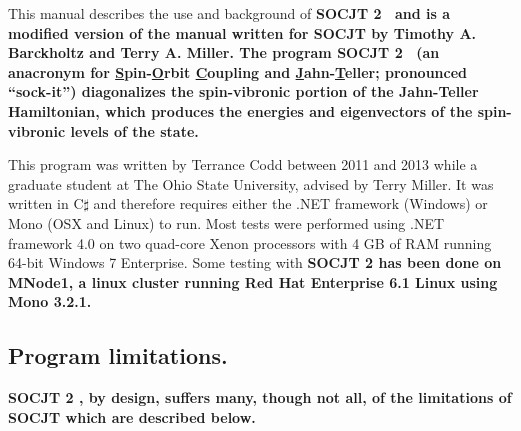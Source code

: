 \documentclass{article}
\newcommand{\ul}{\underline }
\newcommand{\socjttwo}{\bf{SOCJT 2 }}
\newcommand{\socjt}{{\bf SOCJT }}
\newcommand{\socrt}{{\bf SOCRT}}
\begin{document}
This manual describes the use and background of \socjttwo\ and is a modified version of the manual written for \socjt by Timothy A. Barckholtz and Terry A. Miller.
The program \socjttwo\ (an anacronym for {\ul S}pin-{\ul O}rbit {\ul C}oupling
and {\ul J}ahn-{\ul T}eller; pronounced ``sock-it'') diagonalizes the
spin-vibronic portion of the Jahn-Teller Hamiltonian, which produces
the energies and eigenvectors of the spin-vibronic levels of the
state.

\begin{comment}
Besides diagonalizing the spin-vibronic Hamiltonian, the programs
\socjt\ and \socrt\ calculate several properties of the system. All of
these properties are detailed later in section \ref{section:output}.
One of the most important items calculated by \socjt\ is the relative
intensities of the vibronic transitions involved in an electronic
transition to and from the degenerate state. These calculations assume
diagonal Franck-Condon factors, and only the intensities of
progressions of the Jahn-Teller active modes are computed. In the main
\socjt\ and \socrt\ programs, it is assumed that the non-Jahn-Teller
active state involved in the electronic transition is a singly
degenerate or non-Jahn-Teller active degenerate state.
\end{comment}

This program was written by Terrance Codd between 2011 and 2013 while
a graduate student at The Ohio State University, advised by Terry
Miller. It was written in C$\sharp$ and therefore requires either the .NET framework (Windows) or Mono (OSX and Linux) to run.  Most tests were performed using .NET framework 4.0 on two quad-core Xenon processors with 4 GB of RAM running 64-bit Windows 7 Enterprise.  Some testing with \socjttwo has been done on MNode1, a linux cluster running Red Hat Enterprise 6.1 Linux using Mono 3.2.1.
\begin{comment}
A version for the Cray
operating system is available upon request, as is the source code for
the DOS versions. This program should be cited as: Barckholtz, T. A.;
Miller, T. A.  {\it Int. Rev. Phys. Chem.}, {\bf 1998}, {\it 17},
435-524.
\end{comment}

\subsection{Program limitations.} \label{section:limitations}
\socjttwo, by design, suffers many, though not all, of the limitations of \socjt which are described below.
\end{document}
